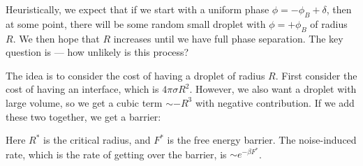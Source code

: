 \documentclass[a4paper]{article}
\begin{document}
Heuristically, we expect that if we start with a uniform phase $\phi = -\phi_B + \delta$, then at some point, there will be some random small droplet with $\phi = +\phi_B$ of radius $R$. We then hope that $R$ increases until we have full phase separation. The key question is --- how unlikely is this process?
\begin{center}
\end{center}
The idea is to consider the cost of having a droplet of radius $R$. First consider the cost of having an interface, which is $4 \pi \sigma R^2$. However, we also want a droplet with large volume, so we get a cubic term $\sim -R^3$ with negative contribution. If we add these two together, we get a barrier:
\begin{center}
\end{center}
Here $R^*$ is the critical radius, and $F^*$ is the free energy barrier. The noise-induced rate, which is the rate of getting over the barrier, is $\sim e^{-\beta F^*}$.
\printindex
\end{document}
